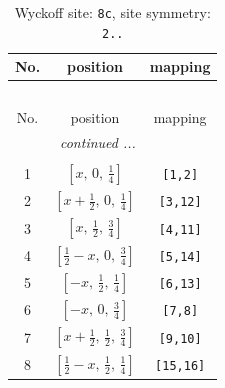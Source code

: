 \documentclass[fleqn,8pt]{jsarticle}
\begin{document}
\begin{longtable}{ccc}
\caption{Wyckoff site: {\tt 8c}, site symmetry: {\tt 2..}}
 \\
 \hline \hline
No. & position & mapping \\ \hline \endfirsthead

\multicolumn{2}{l}{\tablename\ \thetable{}} \\
 \hline \hline
No. & position & mapping \\ \hline \endhead

 \hline \hline
\multicolumn{2}{r}{\footnotesize\it continued ...} \\ \endfoot

 \hline \hline
\multicolumn{2}{r}{} \\ \endlastfoot

1 & $\left[ x,\, 0,\, \frac{1}{4} \right]$ & {\tt [1,2]} \\ \hline
2 & $\left[ x + \frac{1}{2},\, 0,\, \frac{1}{4} \right]$ & {\tt [3,12]} \\ \hline
3 & $\left[ x,\, \frac{1}{2},\, \frac{3}{4} \right]$ & {\tt [4,11]} \\ \hline
4 & $\left[ \frac{1}{2} - x,\, 0,\, \frac{3}{4} \right]$ & {\tt [5,14]} \\ \hline
5 & $\left[ - x,\, \frac{1}{2},\, \frac{1}{4} \right]$ & {\tt [6,13]} \\ \hline
6 & $\left[ - x,\, 0,\, \frac{3}{4} \right]$ & {\tt [7,8]} \\ \hline
7 & $\left[ x + \frac{1}{2},\, \frac{1}{2},\, \frac{3}{4} \right]$ & {\tt [9,10]} \\ \hline
8 & $\left[ \frac{1}{2} - x,\, \frac{1}{2},\, \frac{1}{4} \right]$ & {\tt [15,16]} \\
\end{longtable}
\renewcommand{\arraystretch}{1.2}
\end{document}
